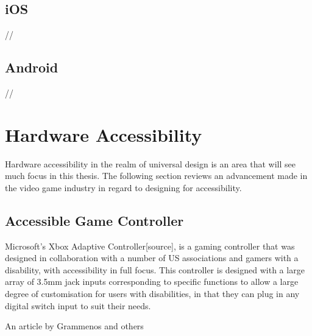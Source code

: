 
\subsection{iOS}
//


\subsection{Android}
//


\section{Hardware Accessibility}
Hardware accessibility in the realm of universal design is an area that will see much focus in this thesis. %
The following section reviews an advancement made in the video game industry in regard to designing for accessibility.


\subsection{Accessible Game Controller}
Microsoft's Xbox Adaptive Controller[source], is a gaming controller that was designed in collaboration with a number of US associations and gamers with a disability, with accessibility in full focus.
This controller is designed with a large array of 3.5mm jack inputs corresponding to specific functions to allow a large degree of customisation for users with disabilities, in that they can plug in any digital switch input to suit their needs.

An article by Grammenos and others 



